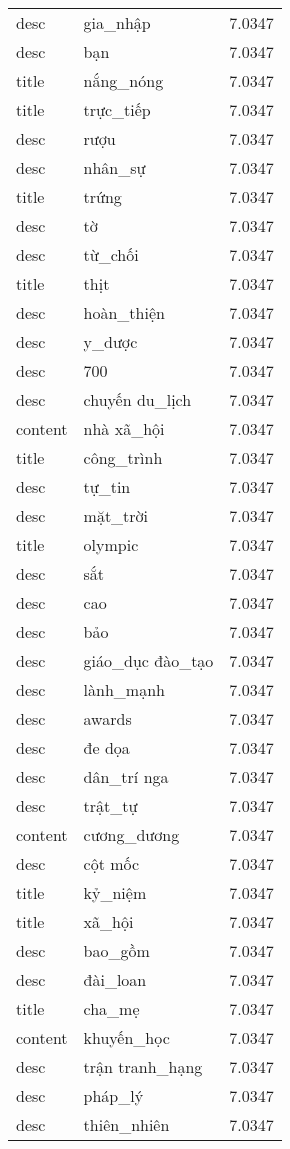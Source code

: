 \documentclass{article}
\begin{document}
\begin{tabular}{lll}
desc & gia\_nhập & 7.0347\\
desc & bạn & 7.0347\\
title & nắng\_nóng & 7.0347\\
title & trực\_tiếp & 7.0347\\
desc & rượu & 7.0347\\
desc & nhân\_sự & 7.0347\\
title & trứng & 7.0347\\
desc & tờ & 7.0347\\
desc & từ\_chối & 7.0347\\
title & thịt & 7.0347\\
desc & hoàn\_thiện & 7.0347\\
desc & y\_dược & 7.0347\\
desc & 700 & 7.0347\\
desc & chuyến du\_lịch & 7.0347\\
content & nhà xã\_hội & 7.0347\\
title & công\_trình & 7.0347\\
desc & tự\_tin & 7.0347\\
desc & mặt\_trời & 7.0347\\
title & olympic & 7.0347\\
desc & sắt & 7.0347\\
desc & cao & 7.0347\\
desc & bảo & 7.0347\\
desc & giáo\_dục đào\_tạo & 7.0347\\
desc & lành\_mạnh & 7.0347\\
desc & awards & 7.0347\\
desc & đe dọa & 7.0347\\
desc & dân\_trí nga & 7.0347\\
desc & trật\_tự & 7.0347\\
content & cương\_dương & 7.0347\\
desc & cột mốc & 7.0347\\
title & kỷ\_niệm & 7.0347\\
title & xã\_hội & 7.0347\\
desc & bao\_gồm & 7.0347\\
desc & đài\_loan & 7.0347\\
title & cha\_mẹ & 7.0347\\
content & khuyến\_học & 7.0347\\
desc & trận tranh\_hạng & 7.0347\\
desc & pháp\_lý & 7.0347\\
desc & thiên\_nhiên & 7.0347\\

\end{tabular}
\end{document}
